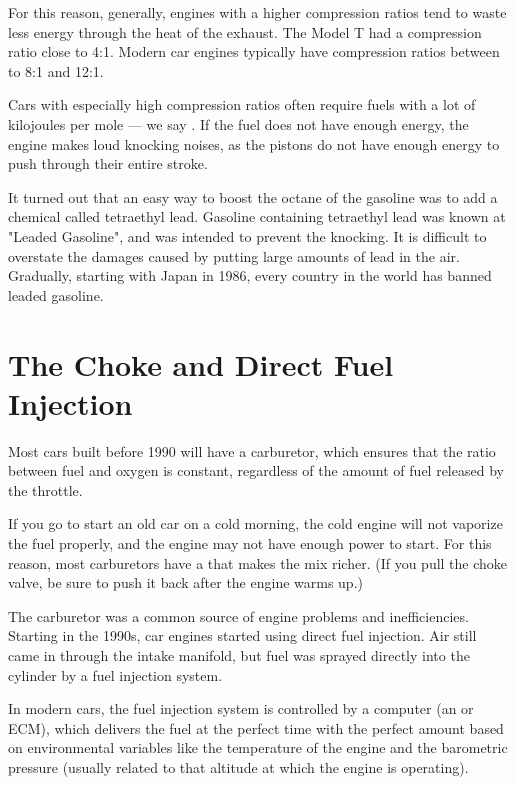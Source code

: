 For this reason, generally, engines with a higher compression ratios tend to waste less energy through the heat of the exhaust. The Model T had a compression ratio close to 4:1. Modern car engines typically have compression ratios between to 8:1 and 12:1. 

Cars with especially high compression ratios often require fuels with a lot of kilojoules per mole --- we say .  If the fuel does not have enough energy, the engine makes loud knocking noises, as the pistons do not have enough energy to push through their entire stroke.

It turned out that an easy way to boost the octane of the gasoline was to add a chemical called tetraethyl lead. Gasoline containing tetraethyl lead was known at "Leaded Gasoline", and was intended to prevent the knocking.  It is difficult to overstate the damages caused by putting large amounts of lead in the air. Gradually, starting with Japan in 1986, every country in the world has banned leaded gasoline.

\section{The Choke and Direct Fuel Injection}

Most cars built before 1990 will have a carburetor, which ensures that the ratio between fuel and oxygen is constant, regardless of the amount of fuel released by the throttle.  

If you go to start an old car on a cold morning, the cold engine will not vaporize the fuel properly, and the engine may not have enough power to start.  For this reason, most carburetors have a  that makes the mix richer. (If you pull the choke valve, be sure to push it back after the engine warms up.)

The carburetor was a common source of engine problems and inefficiencies.  Starting in the 1990s, car engines started using direct fuel injection. Air still came in through the intake manifold, but fuel was sprayed directly into the cylinder by a fuel injection system.

In modern cars, the fuel injection system is controlled by a computer (an  or ECM), which delivers the fuel at the perfect time with the perfect amount based on environmental variables like the temperature of the engine and the barometric pressure (usually related to that altitude at which the engine is operating).


